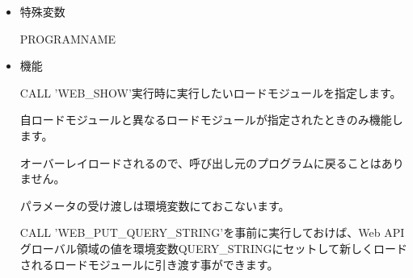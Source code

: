 \begin{itemize}
\item{特殊変数}

  PROGRAMNAME

\item{機能}

CALL 'WEB\_SHOW'実行時に実行したいロードモジュールを指定します。

自ロードモジュールと異なるロードモジュールが指定されたときのみ機能します。

オーバーレイロードされるので、呼び出し元のプログラムに戻ることはありません。

パラメータの受け渡しは環境変数にておこないます。

CALL 'WEB\_PUT\_QUERY\_STRING'を事前に実行しておけば、Web APIグローバル領域の値を環境変数QUERY\_STRINGにセットして新しくロードされるロードモジュールに引き渡す事ができます。



\end{itemize}


